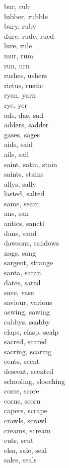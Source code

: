 bur, rub\\
lubber, rubble\\
bury, ruby\\
dure, rude, rued\\
lure, rule\\
mur, rum\\
run, urn\\
rushes, ushers\\
rictus, rustic\\
ryan, yarn\\
rye, yer\\
ads, das, sad\\
adders, sadder\\
gases, sages\\
aids, said\\
ails, sail\\
saint, satin, stain\\
saints, stains\\
allys, sally\\
lasted, salted\\
same, seam\\
ans, san\\
antics, sancti\\
dans, sand\\
dawsons, sandows\\
nags, sang\\
sargent, strange\\
santa, satan\\
dates, sated\\
save, vase\\
saviour, various\\
aswing, sawing\\
cabbys, scabby\\
claps, clasp, scalp\\
sacred, scared\\
sacring, scaring\\
cents, scent\\
descent, scented\\
schooling, slooching\\
corse, score\\
corns, scorn\\
capers, scrape\\
crawls, scrawl\\
creams, scream\\
cuts, scut\\
elsa, sale, seal\\
sales, seals\\
